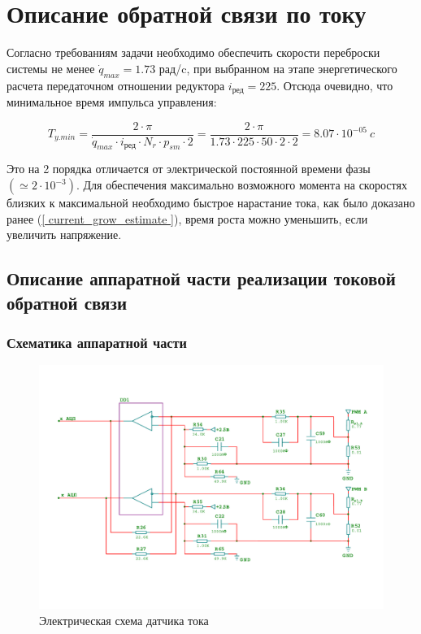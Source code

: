 \newpage
\section{ Описание обратной связи по току }
Согласно требованиям задачи необходимо обеспечить скорости переброски системы не менее
$ \dot{q}_{max} = 1.73 $ рад/c, при выбранном на этапе энергетического расчета передаточном
отношении редуктора $ i_\text{ред} = 225 $. Отсюда очевидно, что минимальное время импульса управления:

$$
    T_{y.min} = \frac{ 2 \cdot \pi }{ \dot{q}_{max} \cdot i_\text{ред} \cdot N_{r} \cdot p_{sm} \cdot 2 }
    = \frac{ 2 \cdot \pi }{ 1.73 \cdot 225 \cdot 50 \cdot 2 \cdot 2 }
    = 8.07 \cdot 10^{-05} ~c
$$

Это на 2 порядка отличается от электрической постоянной времени фазы $( \simeq2 \cdot 10^{-3} )$.
Для обеспечения максимально возможного момента на скоростях близких к максимальной необходимо
быстрое нарастание тока, как было доказано ранее (\ref{ current_grow_estimate }), время роста можно
уменьшить, если увеличить напряжение.

\subsection{ Описание аппаратной части реализации токовой обратной связи }

\subsubsection{ Схематика аппаратной части }

\begin{figure}[ht!]
    \centering
    \includegraphics[width=\textwidth, keepaspectratio, clip=true, trim=0mm 25mm 0mm 25mm]
                    {./src/pictures/current_measuring_sheme}
    \caption{Электрическая схема датчика тока}
    \label{graph_speed_and_angle_comutation}
\end{figure}

